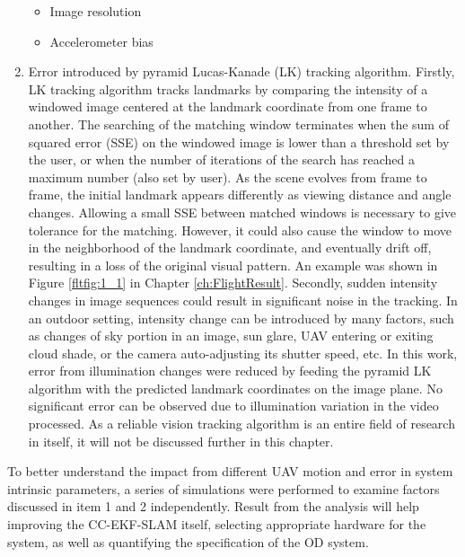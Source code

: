 \begin{enumerate}
\begin{itemize}
    \item Image resolution
    \item Accelerometer bias %
  \end{itemize}
  \item Error introduced by pyramid Lucas-Kanade (LK) tracking
  algorithm. Firstly, LK tracking algorithm tracks landmarks by
  comparing the intensity of a windowed image centered at the landmark
  coordinate from one frame to another. The searching of the matching
  window terminates when the sum of squared error (SSE) on the
  windowed image is lower than a threshold set by the user, or when
  the number of iterations of the search has reached a maximum number
  (also set by user). As the scene evolves from frame to frame, the
  initial landmark appears differently as viewing distance and angle
  changes. Allowing a small SSE between matched windows is necessary
  to give tolerance for the matching. However, it could also cause the
  window to move in the neighborhood of the landmark coordinate, and
  eventually drift off, resulting in a loss of the original visual
  pattern. An example was shown in Figure \ref{fltfig:1_1} in Chapter
  \ref{ch:FlightResult}. Secondly, sudden intensity changes in image
  sequences could result in significant noise in the tracking. In an
  outdoor setting, intensity change can be introduced by many factors,
  such as changes of sky portion in an image, sun glare, UAV entering
  or exiting cloud shade, or the camera auto-adjusting its shutter
  speed, etc. In this work, error from illumination changes were
  reduced by feeding the pyramid LK algorithm with the predicted
  landmark coordinates on the image plane. No significant error can be
  observed due to illumination variation in the video processed. As a
  reliable vision tracking algorithm is an entire field of research in
  itself, it will not be discussed further in this chapter.

\end{enumerate}

To better understand the impact from different UAV motion and error in
system intrinsic parameters, a series of simulations were performed to
examine factors discussed in item 1 and 2 independently. Result from
the analysis will help improving the CC-EKF-SLAM itself, selecting
appropriate hardware for the system, as well as quantifying the
specification of the OD system.

